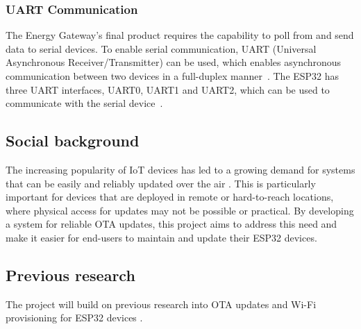 \subsubsection{UART Communication}\label{subsec:uart}
The Energy Gateway's final product requires the capability to poll from and send data to serial devices. To enable serial communication, UART (Universal Asynchronous Receiver/Transmitter) can be used, which enables asynchronous communication between two devices in a full-duplex manner~\cite{philips:uart}. The ESP32 has three UART interfaces, UART0, UART1 and UART2, which can be used to communicate with the serial device~\cite{espressif:esp32_datasheet}.

\subsection{Social background}
\label{sec:social}
The increasing popularity of IoT devices has led to a growing demand for systems that can be easily and reliably updated over the air \cite{Villegas:2019}. This is particularly important for devices that are deployed in remote or hard-to-reach locations, where physical access for updates may not be possible or practical. By developing a system for reliable OTA updates, this project aims to address this need and make it easier for end-users to maintain and update their ESP32 devices.

\subsection{Previous research}
\label{sec:previous}
The project will build on previous research into OTA updates and Wi-Fi provisioning for ESP32 devices \cite{espressif:esp-idf-programming-guide}.
